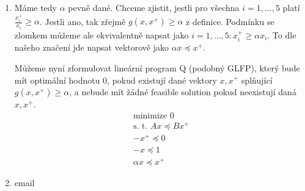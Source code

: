 \documentclass[12pt, a4paper]{article}
\begin{document}
\begin{enumerate}[label=\alph*)]
\item Máme tedy $\alpha$ pevně dané. Chceme zjistit, jestli pro všechna $i=1,\dots,5$ platí $\frac{x_i^+}{x_i} \geq \alpha$. Jestli ano, tak zřejmě $g(x,x^+)\geq \alpha$ z definice. Podmínku se zlomkem můžeme ale ekvivalentně napsat jako $i=1,\dots,5: x_i^+ \geq \alpha x_i$. To dle našeho značení jde napsat vektorově jako $\alpha x \preceq x^+$. 

Můžeme nyní zformulovat lineární program Q (podobný GLFP), který bude mít optimální hodnotu 0, pokud existují dané vektory $x,x^+$ splňující $g(x,x^+)\geq \alpha$, a nebude mít žádné feasible solution pokud neexistují daná $x,x^+$.
\begin{gather*}
\text{minimize } 0\\
\text{s. t. } Ax \preceq Bx^{+}\\
-x^{+} \preceq 0\\
-x \preceq 1 \\
\alpha x \preceq x^+
\end{gather*}

\item email
\end{enumerate}
\end{document}
